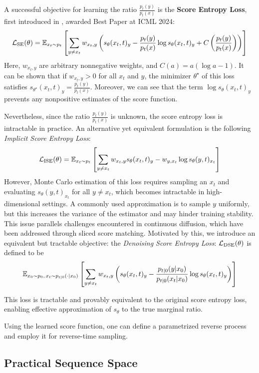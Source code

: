 \documentclass[11pt, a4paper]{article}
\begin{document}
A successful objective for learning the ratio \(\frac{p_t(y)}{p_t(x)}\) is the \textbf{Score Entropy Loss}, first introduced in \cite{lou2024discretediffusionmodelingestimating}, awarded Best Paper at ICML 2024:
\[
{\cal L}_\text{SE}(\theta)=\mathbb{E}_{x_t\sim p_t}\left[ \sum_{y\neq x_t} w_{x_t,y}\left(s_\theta(x_t,t)_y-\frac{p_t(y)}{p_t(x)}\log s_\theta(x_t,t)_y 
+C\left(\frac{p_t(y)}{p_t(x)}\right) \right) \right]
\]
Here, \(w_{x_t,y}\) are arbitrary nonnegative weights, and \(C(a)=a(\log a-1)\). It can be shown that if \(w_{x_t,y}>0\) for all \(x_t\) and \(y\), the minimizer \(\theta^\star\) of this loss satisfies \(s_{\theta^\star}(x_t,t)_y=\frac{p_t(y)}{p_t(x)}\). Moreover, we can see that the term \(\log s_\theta(x_t,t)_y\) prevents any nonpositive estimates of the score function.

Nevertheless, since the ratio \(\frac{p_t(y)}{p_t(x)}\) is unknown, the score entropy loss is intractable in practice. An alternative yet equivalent formulation is the following \emph{Implicit Score Entropy Loss}:
\[
{\cal L}_\text{ISE}(\theta) = \mathbb{E}_{x_t\sim p_t} \left[ \sum_{y\neq x_t} w_{x_t,y}s_\theta(x_t,t)_y - w_{y,x_t}\log s_\theta(y,t)_{x_t} \right]
\]
However, Monte Carlo estimation of this loss requires sampling an \(x_t\) and evaluating \(s_\theta(y,t)_{x_t}\) for all \(y\neq x_t\), which becomes intractable in high-dimensional settings.
A commonly used approximation is to sample \(y\) uniformly, but this increases the variance of the estimator and may hinder training stability.
This issue parallels challenges encountered in continuous diffusion, which have been addressed through sliced score matching.
Motivated by this, we introduce an equivalent but tractable objective: the \emph{Denoising Score Entropy Loss}: \({\cal L}_\text{DSE}(\theta)\) is defined to be
\begin{align*}
    \mathbb{E}_{x_0\sim p_0,\,x_t\sim p_{t|0}(\cdot|x_0)}\left[ \sum_{y\neq x_t} w_{x_t,y} \left(s_\theta(x_t,t)_y - \frac{p_{t|0}(y|x_0)}{p_{t|0}(x_t|x_0)} \log s_\theta(x_t,t)_y \right) \right]
\end{align*}


This loss is tractable and provably equivalent to the original score entropy loss, enabling effective approximation of \(s_\theta\) to the true marginal ratio.

Using the learned score function, one can define a parametrized reverse process and employ it for reverse-time sampling.

\subsection{Practical Sequence Space}
\end{document}
